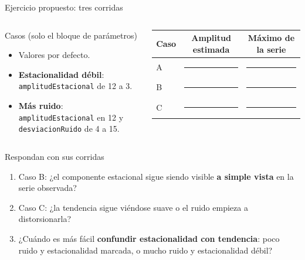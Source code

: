 \documentclass[aspectratio=169,xcolor=dvipsnames]{beamer}
\begin{document}
\begin{frame}{Ejercicio propuesto: tres corridas}
\begin{columns}[T]
  \begin{exampleblock}{Casos (solo el bloque de parámetros)}
    \scriptsize
    \begin{itemize}
      \item[\textbf{A}] Valores por defecto.
      \item[\textbf{B}] \textbf{Estacionalidad débil}: \texttt{amplitudEstacional} de 12 a 3.
      \item[\textbf{C}] \textbf{Más ruido}: \texttt{amplitudEstacional} en 12 y \texttt{desviacionRuido} de 4 a 15.
    \end{itemize}
  \end{exampleblock}
  \footnotesize
  \begin{tabular}{@{}lcc@{}}
    \toprule
    Caso & Amplitud estimada & Máximo de la serie \\
    \midrule
    A & \rule{1.3cm}{0.4pt} & \rule{1.3cm}{0.4pt} \\[2pt]
    B & \rule{1.3cm}{0.4pt} & \rule{1.3cm}{0.4pt} \\[2pt]
    C & \rule{1.3cm}{0.4pt} & \rule{1.3cm}{0.4pt} \\
    \bottomrule
  \end{tabular}
\end{columns}
\vspace{2pt}
\begin{block}{Respondan con sus corridas}
  \scriptsize
  \begin{enumerate}
    \item Caso B: ¿el componente estacional sigue siendo visible \textbf{a simple vista} en la serie observada?
    \item Caso C: ¿la tendencia sigue viéndose suave o el ruido empieza a distorsionarla?
    \item ¿Cuándo es más fácil \textbf{confundir estacionalidad con tendencia}: poco ruido y estacionalidad marcada, o mucho ruido y estacionalidad débil?
  \end{enumerate}
\end{block}
\end{frame}
\end{document}
